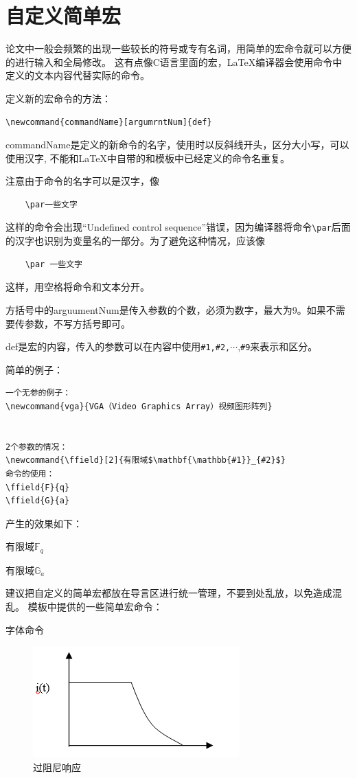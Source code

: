 \documentclass[../../main.tex]{subfiles}
\begin{document}
\section{自定义简单宏}
论文中一般会频繁的出现一些较长的符号或专有名词，用简单的宏命令就可以方便的进行输入和全局修改。
这有点像C语言里面的宏，LaTeX编译器会使用命令中定义的文本内容代替实际的命令。

定义新的宏命令的方法：

\begin{verbatim}
\newcommand{commandName}[argumrntNum]{def}
\end{verbatim}

commandName是定义的新命令的名字，使用时以反斜线开头，区分大小写，可以使用汉字,
不能和LaTeX中自带的和模板中已经定义的命令名重复。

注意由于命令的名字可以是汉字，像
\begin{verbatim}
	\par一些文字
\end{verbatim}
这样的命令会出现“Undefined control sequence”错误，因为编译器将命令\verb|\par|后面的汉字也识别为变量名的一部分。为了避免这种情况，应该像
\begin{verbatim}
	\par 一些文字
\end{verbatim}
这样，用空格将命令和文本分开。

方括号中的arguumentNum是传入参数的个数，必须为数字，最大为9。如果不需要传参数，不写方括号即可。

def是宏的内容，传入的参数可以在内容中使用\verb|#1,#2,|$\cdots$,\verb|#9|来表示和区分。

简单的例子：

\begin{verbatim}
一个无参的例子：
\newcommand{vga}{VGA（Video Graphics Array）视频图形阵列}


2个参数的情况：
\newcommand{\ffield}[2]{有限域$\mathbf{\mathbb{#1}}_{#2}$}
命令的使用：
\ffield{F}{q}
\ffield{G}{a}

\end{verbatim}

产生的效果如下：
\newcommand{\ffield}[2]{有限域$\mathbf{\mathbb{#1}}_{#2}$}

\ffield{F}{q}

\ffield{G}{a}




建议把自定义的简单宏都放在导言区进行统一管理，不要到处乱放，以免造成混乱。
模板中提供的一些简单宏命令：

字体命令


\begin{figure}[htbp]
\centering

\includegraphics{../../figure/guozuni.png}
\caption{过阻尼响应}
\label{guozuni}
\end{figure}
\end{document}
